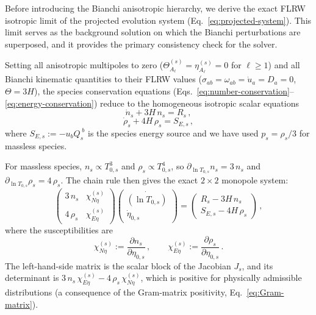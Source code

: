 Before introducing the Bianchi anisotropic hierarchy,
we derive the exact FLRW isotropic limit of the
projected evolution system
(Eq.~\ref{eq:projected-system}).  This limit serves
as the background solution on which the Bianchi
perturbations are superposed, and it provides the
primary consistency check for the solver.

Setting all anisotropic multipoles to zero
($\Theta^{(s)}_{A_\ell} = \eta^{(s)}_{A_\ell} = 0$
for $\ell \geq 1$) and all Bianchi kinematic
quantities to their FLRW values
($\sigma_{ab} = \omega_{ab} = \dot{u}_a = D_a = 0$,
$\Theta = 3H$), the species conservation equations
(Eqs.~\ref{eq:number-conservation}--\ref{eq:energy-conservation})
reduce to the homogeneous isotropic scalar equations
\begin{equation}\label{eq:ndot-FLRW}
\dot{n}_s + 3H\, n_s = R_s\,,
\end{equation}
\begin{equation}\label{eq:rhodot-FLRW}
\dot{\rho}_s + 4H\, \rho_s = S_{E,s}\,,
\end{equation}
where $S_{E,s} := -u_b Q_s^{\;b}$ is the species
energy source and we have used $p_s = \rho_s/3$ for
massless species.

For massless species, $n_s \propto T_{0,s}^3$ and
$\rho_s \propto T_{0,s}^4$, so
$\partial_{\ln T_{0,s}} n_s = 3\,n_s$ and
$\partial_{\ln T_{0,s}} \rho_s = 4\,\rho_s$.  The
chain rule then gives the exact $2 \times 2$ monopole
system:
\begin{equation}\label{eq:FLRW-2x2}
\boxed{
\begin{pmatrix}
3\,n_s & \chi^{(s)}_{N\eta} \\[4pt]
4\,\rho_s & \chi^{(s)}_{E\eta}
\end{pmatrix}
\begin{pmatrix}
\dot{(\ln T_{0,s})} \\[4pt]
\dot{\eta}_{0,s}
\end{pmatrix}
=
\begin{pmatrix}
R_s - 3H\, n_s \\[4pt]
S_{E,s} - 4H\, \rho_s
\end{pmatrix}\,,
}
\end{equation}
where the susceptibilities are
\begin{equation}\label{eq:susceptibilities}
\chi^{(s)}_{N\eta}
:= \frac{\partial n_s}{\partial \eta_{0,s}}\,,
\qquad
\chi^{(s)}_{E\eta}
:= \frac{\partial \rho_s}{\partial \eta_{0,s}}\,.
\end{equation}
The left-hand-side matrix is the scalar block of the
Jacobian $J_s$, and its determinant is
$3\,n_s\,\chi^{(s)}_{E\eta}
- 4\,\rho_s\,\chi^{(s)}_{N\eta}$, which is positive
for physically admissible distributions (a consequence
of the Gram-matrix positivity,
Eq.~\ref{eq:Gram-matrix}).

